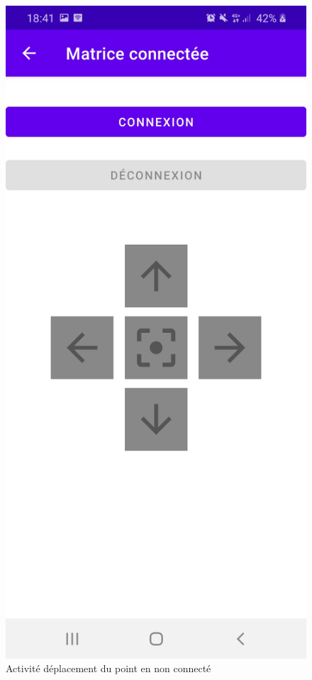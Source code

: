 \documentclass[a4paper,12pt]{report}
\begin{document}
		\begin{figure}[H]
			\centering
				\includegraphics[scale=0.2]{images/depnco.jpg}
				\caption{Activité déplacement du point en non connecté}
		\end{figure}
		
\end{document}
